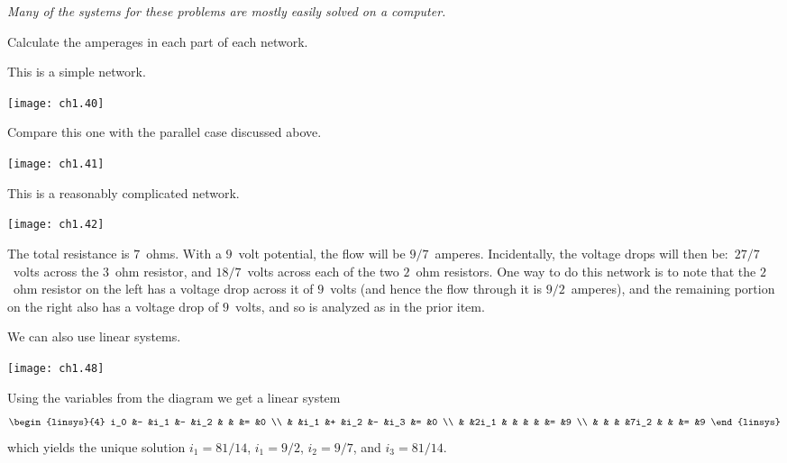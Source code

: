 \begin{exercises}
  \item[] \textit{Many of the systems for these problems
      are mostly easily solved on a computer.}
  \item 
    Calculate the amperages in each part of each network.
    \begin{exparts}
      \partsitem This is a simple network.
          \begin{center}
             \texttt{[image: ch1.40]}
        \end{center}
      \partsitem Compare this one with the parallel case discussed above.
          \begin{center}
             \texttt{[image: ch1.41]}
        \end{center}
      \partsitem This is a reasonably complicated network.
          \begin{center}
           \texttt{[image: ch1.42]}
        \end{center}
    \end{exparts}
    \begin{answer}
      \begin{exparts}
        \partsitem The total resistance is $7$~ohms.
          With a $9$~volt potential, the flow will be $9/7$~amperes.
          Incidentally, the voltage drops will then be:~$27/7$~volts
          across the $3$~ohm resistor, and $18/7$~volts across each of
          the two $2$~ohm resistors.        
        \partsitem One way to do this network is to note that the $2$~ohm
          resistor on the left has a voltage drop across it of $9$~volts
          (and hence the flow through it is $9/2$~amperes), and the 
          remaining portion on the right also has a voltage drop of 
          $9$~volts, and so is analyzed as in the prior item.

          We can also use linear systems.
          \begin{center}
            \texttt{[image: ch1.48]}
          \end{center}
          Using the variables from the diagram we get a linear system
          \begin{equation*}
            \begin{linsys}{4}
              i_0  &- &i_1  &- &i_2  &  &    &= &0  \\
                   &  &i_1  &+ &i_2  &- &i_3 &= &0  \\
                   &  &2i_1 &  &     &  &    &= &9  \\  
                   &  &     &  &7i_2 &  &    &= &9       
            \end{linsys}
          \end{equation*}
          which yields the unique solution $i_1=81/14$, $i_1=9/2$, $i_2=9/7$,
          and $i_3=81/14$.


\end{exparts}
\end{answer}
\end{exercises}
